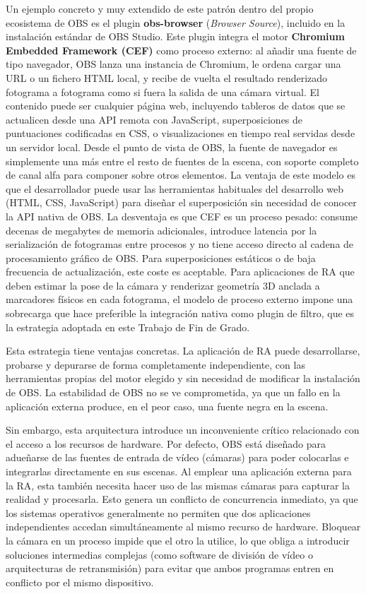 Un ejemplo concreto y muy extendido de este patrón dentro del propio ecosistema de OBS es el plugin \textbf{obs-browser} (\textit{Browser Source}), incluido en la instalación estándar de OBS Studio. Este plugin integra el motor \textbf{Chromium Embedded Framework (CEF)} como proceso externo: al añadir una fuente de tipo navegador, OBS lanza una instancia de Chromium, le ordena cargar una URL o un fichero HTML local, y recibe de vuelta el resultado renderizado fotograma a fotograma como si fuera la salida de una cámara virtual. El contenido puede ser cualquier página web, incluyendo tableros de datos que se actualicen desde una API remota con JavaScript, superposiciones de puntuaciones codificadas en CSS, o visualizaciones en tiempo real servidas desde un servidor local. Desde el punto de vista de OBS, la fuente de navegador es simplemente una más entre el resto de fuentes de la escena, con soporte completo de canal alfa para componer sobre otros elementos. La ventaja de este modelo es que el desarrollador puede usar las herramientas habituales del desarrollo web (HTML, CSS, JavaScript) para diseñar el superposición sin necesidad de conocer la API nativa de OBS. La desventaja es que CEF es un proceso pesado: consume decenas de megabytes de memoria adicionales, introduce latencia por la serialización de fotogramas entre procesos y no tiene acceso directo al cadena de procesamiento gráfico de OBS. Para superposiciones estáticos o de baja frecuencia de actualización, este coste es aceptable. Para aplicaciones de RA que deben estimar la pose de la cámara y renderizar geometría 3D anclada a marcadores físicos en cada fotograma, el modelo de proceso externo impone una sobrecarga que hace preferible la integración nativa como plugin de filtro, que es la estrategia adoptada en este Trabajo de Fin de Grado.

Esta estrategia tiene ventajas concretas. La aplicación de RA puede desarrollarse, probarse y depurarse de forma completamente independiente, con las herramientas propias del motor elegido y sin necesidad de modificar la instalación de OBS. La estabilidad de OBS no se ve comprometida, ya que un fallo en la aplicación externa produce, en el peor caso, una fuente negra en la escena.

Sin embargo, esta arquitectura introduce un inconveniente crítico relacionado con el acceso a los recursos de hardware. Por defecto, OBS está diseñado para adueñarse de las fuentes de entrada de vídeo (cámaras) para poder colocarlas e integrarlas directamente en sus escenas. Al emplear una aplicación externa para la RA, esta también necesita hacer uso de las mismas cámaras para capturar la realidad y procesarla. Esto genera un conflicto de concurrencia inmediato, ya que los sistemas operativos generalmente no permiten que dos aplicaciones independientes accedan simultáneamente al mismo recurso de hardware. Bloquear la cámara en un proceso impide que el otro la utilice, lo que obliga a introducir soluciones intermedias complejas (como software de división de vídeo o arquitecturas de retransmisión) para evitar que ambos programas entren en conflicto por el mismo dispositivo.

